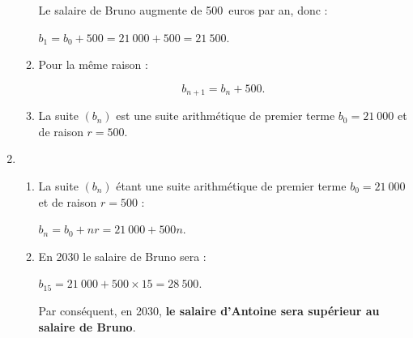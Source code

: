 \begin{corrige}
\begin{enumerate}
\begin{enumerate}[label=\alph*.]
               Le salaire de Bruno augmente de 500~euros par an, donc :
               \par
               $b_1=b_0+500=21\ 000+500=21\ 500$.
               \par
               \item %
               \par
               Pour la même raison :
               \par
               \[b_{n+1}=b_{n}+500.\]
               \par
               \item %
               \par
               La suite $(b_n)$ est une suite arithmétique de premier terme ${b_0=21\ 000}$ et de raison ${r=500}$.
          \end{enumerate}
          \par
          \item %
          \par
          \begin{enumerate}[label=\alph*.]
               \par
               \item %
               La suite $(b_n)$ étant une suite arithmétique de premier terme ${b_0=21\ 000}$ et de raison ${r=500}$ :
               \par
               $b_n=b_0+nr=21\ 000+500n$.
               \item %
               En 2030 le salaire de Bruno sera :
               \par
               $b_{15}=21~000 + 500 \times 15 = 28~500$.
               \par
               Par conséquent, en 2030, \textbf{le salaire d'Antoine sera supérieur au salaire de Bruno}.
               \par
          \end{enumerate}
          \par
     \end{enumerate}

\end{corrige}
